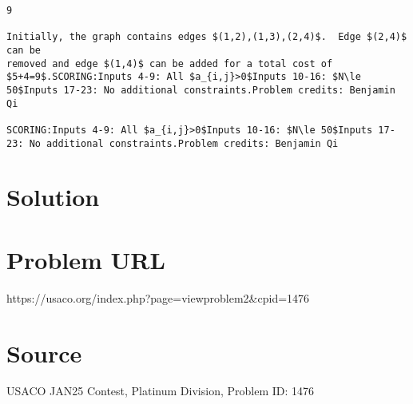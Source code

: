 \documentclass[12pt]{article}
\begin{document}
\begin{verbatim}
9

Initially, the graph contains edges $(1,2),(1,3),(2,4)$.  Edge $(2,4)$ can be
removed and edge $(1,4)$ can be added for a total cost of $5+4=9$.SCORING:Inputs 4-9: All $a_{i,j}>0$Inputs 10-16: $N\le 50$Inputs 17-23: No additional constraints.Problem credits: Benjamin Qi

SCORING:Inputs 4-9: All $a_{i,j}>0$Inputs 10-16: $N\le 50$Inputs 17-23: No additional constraints.Problem credits: Benjamin Qi
\end{verbatim}

\section*{Solution}


\section*{Problem URL}
https://usaco.org/index.php?page=viewproblem2&cpid=1476

\section*{Source}
USACO JAN25 Contest, Platinum Division, Problem ID: 1476
\end{document}
